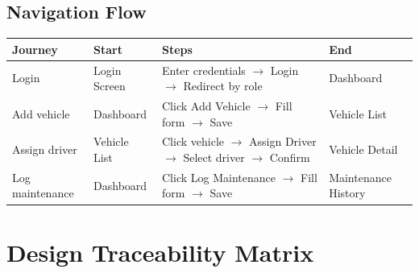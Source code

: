 \documentclass[11pt,a4paper]{article}
\begin{document}
\subsection{Navigation Flow}

\begin{table}[H]
\centering
\begin{tabularx}{\textwidth}{|p{3cm}|p{2.5cm}|p{5cm}|p{3cm}|}
\hline
\textbf{Journey} & \textbf{Start} & \textbf{Steps} & \textbf{End} \\
\hline
Login & Login Screen & Enter credentials $\rightarrow$ Login $\rightarrow$ Redirect by role & Dashboard \\
\hline
Add vehicle & Dashboard & Click Add Vehicle $\rightarrow$ Fill form $\rightarrow$ Save & Vehicle List \\
\hline
Assign driver & Vehicle List & Click vehicle $\rightarrow$ Assign Driver $\rightarrow$ Select driver $\rightarrow$ Confirm & Vehicle Detail \\
\hline
Log maintenance & Dashboard & Click Log Maintenance $\rightarrow$ Fill form $\rightarrow$ Save & Maintenance History \\
\hline
\end{tabularx}
\end{table}

\section{Design Traceability Matrix}
\end{document}

